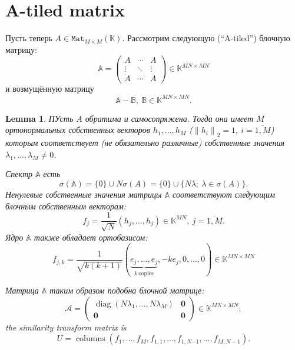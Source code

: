 \documentclass[14pt,a4paper]{extarticle}
\newtheorem{lem}{Lemma}
\theoremstyle{definition}
\begin{document}
\section{A-tiled matrix}

Пусть теперь \( A\in\mathtt{Mat}_{M{\times}M}(\mathbb{K}) \).
Рассмотрим следующую (``A-tiled'') блочную матрицу:
    \[
        \mathbb{A} =
        \begin{pmatrix}
            A & \cdots & A \\
            \vdots & \ddots & \vdots \\
            A & \cdots & A
        \end{pmatrix}
        \in\mathbb{K}^{{MN}{\times}{MN}}
    \]
    и возмущённую матрицу
    \[
        \mathbb{A} - \mathbb{B},\ \mathbb{B}\in\mathbb{K}^{{MN}{\times}{MN}}.
    \]

\begin{lem}
    ПУсть \( A \) обратима и самосопряжена.
    Тогда она имеет \( M \) ортонормальных собственных векторов \( h_1, \ldots, h_M \)
    (\(\left\|h_i\right\|_2 = 1,\ i{=}\overline{1,M}\))
    которым соответствует (не обязательно различные) собственные значения
    \( \lambda_1, \ldots, \lambda_M \neq 0\).

    Спектр \( \mathbb{A} \) есть
    \[
        \sigma(\mathbb{A}) = \{0\}\cup N\sigma(A) = \{0\} \cup \{N\lambda;\ \lambda\in\sigma(A) \}.
    \]
    Ненулевые собственные значения матрицы \( \mathbb{A} \)
    соответствуют следующим блочным собственным векторам:
    \[
        f_j = \frac{1}{\sqrt{N}} (h_j, \ldots, h_j)\in \mathbb{K}^{MN},\ j=\overline{1,M}.
    \]
    Ядро \( \mathbb{A} \)
    также обладает ортобазисом:
    \[
        f_{j,k} = \frac{1}{\sqrt{k(k+1)}}
        (
        \underbrace{e_j, \ldots, e_j}_{k\ \text{copies}},
        -ke_j,
        0, \ldots, 0
        ) \in\mathbb{K}^{{MN}{\times}{MN}}
    \]

    Матрица \( \mathbb{A} \) таким образом подобна блочной матрице:
    \[
        \mathcal{A} =
        \left(\begin{array}{c|c}
            \operatorname{diag}(N\lambda_1,\ldots,N\lambda_M) & \mathbf{0} \\ \hline
            \mathbf{0} & \mathbf{0}
        \end{array}\right)\in\mathbb{K}^{{MN}{\times}{MN}};
    \]
    the similarity transform matrix is
    \[
        U = \operatorname{columns}
        \left(f_1, \ldots, f_M, f_{1,1}, \ldots, f_{1,N{-1}}, \ldots, f_{M,N{-}1}\right).
    \]
\end{lem}
\end{document}
